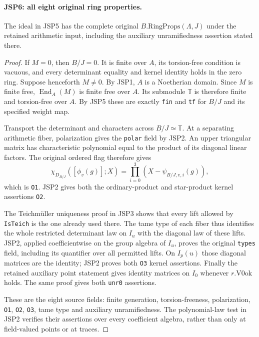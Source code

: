 \paragraph{JSP6: all eight original ring properties.}
\label{claim:JSP6}
The ideal in JSP5 has the complete original
$B.\mathrm{RingProps}(\Lambda,J)$ under the retained arithmetic
input, including the auxiliary unramifiedness assertion stated
there.
\begin{proof}
If $M=0$, then $B/J=0$. It is finite over $A$, its torsion-free
condition is vacuous, and every determinant equality and kernel
identity holds in the zero ring. Suppose henceforth $M\ne0$.
By JSP1, $A$ is a Noetherian domain. Since $M$ is finite free,
$\operatorname{End}_A(M)$ is finite free over $A$.
Its submodule $\mathbb T$ is therefore finite and torsion-free
over $A$. By JSP5 these are exactly \texttt{fin} and
\texttt{tf} for $B/J$ and its specified weight map.

Transport the determinant and characters across
$B/J\simeq\mathbb T$. At a separating arithmetic fiber,
polarization gives the \texttt{polar} field by JSP2.
An upper triangular matrix has characteristic polynomial equal
to the product of its diagonal linear factors. The original
ordered flag therefore gives
\[
 \chi_{D_{B/J}}([\phi_v(g)];X)
       =\prod_{i=0}^{3}(X-\psi_{B/J,v,i}(g)),           \tag{JSP.10}
\]
which is \texttt{O1}. JSP2 gives both the ordinary-product
and star-product kernel assertions \texttt{O2}.

The Teichm\"uller uniqueness proof in JSP3 shows that every
lift allowed by \texttt{IsTeich} is the one already used there.
The tame type of each fiber thus identifies the whole restricted
determinant law on $I_u$ with the diagonal law of these lifts.
JSP2, applied coefficientwise on the group algebra of $I_u$,
proves the original \texttt{types} field, including its
quantifier over all permitted lifts. On $I_p(u)$ those
diagonal matrices are the identity; JSP2 proves both
\texttt{O3} kernel assertions. Finally the retained auxiliary
point statement gives identity matrices on $I_0$ whenever
$r.\mathrm{V0ok}$ holds. The same proof gives both
\texttt{unr0} assertions.

These are the eight source fields: finite generation,
torsion-freeness, polarization, \texttt{O1}, \texttt{O2},
\texttt{O3}, tame type and auxiliary unramifiedness.
The polynomial-law test in JSP2 verifies their assertions over
every coefficient algebra, rather than only at field-valued
points or at traces.
\end{proof}


